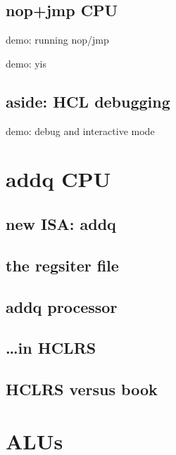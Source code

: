\subsection{nop+jmp CPU}
\begin{frame}{demo: running nop/jmp}
\end{frame}
\begin{frame}{demo: yis}
\end{frame}


\subsection{aside: HCL debugging}
\begin{frame}{demo: debug and interactive mode}
\end{frame}


\section{addq CPU}

\subsection{new ISA: addq}



\subsection{the regsiter file}


\subsection{addq processor}

\subsection{\ldots in HCLRS}


\subsection{HCLRS versus book}


\section{ALUs}
